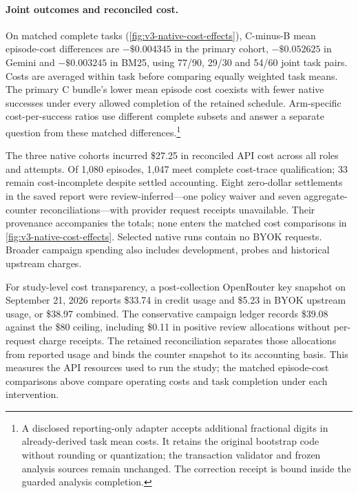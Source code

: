 \paragraph{Joint outcomes and reconciled cost.}
On matched complete tasks (\autoref{fig:v3-native-cost-effects}),
C-minus-B mean episode-cost differences are
$-\$0.004345$ in the primary cohort, $-\$0.052625$ in Gemini and
$-\$0.003245$ in BM25, using 77/90, 29/30 and 54/60 joint task pairs.
Costs are averaged within task before comparing equally weighted task means.
The primary C bundle's lower mean episode cost coexists with fewer native
successes under every allowed completion of the retained schedule. Arm-specific
cost-per-success ratios use different complete subsets and answer a separate
question from these matched differences.\footnote{A disclosed reporting-only
adapter accepts additional fractional digits in already-derived task mean costs.
It retains the original bootstrap code without rounding or quantization;
the transaction validator and frozen analysis sources remain unchanged.
The correction receipt is bound inside the guarded analysis completion.}

The three native cohorts incurred \$27.25 in reconciled API cost across
all roles and attempts. Of 1,080 episodes, 1,047 meet complete cost-trace
qualification; 33 remain cost-incomplete despite settled accounting.
Eight zero-dollar settlements in the saved report were review-inferred---one
policy waiver and seven aggregate-counter reconciliations---with provider
request receipts unavailable. Their provenance accompanies the totals;
none enters the matched cost comparisons in \autoref{fig:v3-native-cost-effects}.
Selected native runs contain no BYOK requests. Broader campaign spending also
includes development, probes and historical upstream charges.

For study-level cost transparency, a post-collection OpenRouter key snapshot
on September 21, 2026 reports \$33.74 in credit usage and \$5.23 in BYOK
upstream usage, or \$38.97 combined. The conservative campaign ledger records
\$39.08 against the \$80 ceiling, including \$0.11 in positive review
allocations without per-request charge receipts. The retained reconciliation
separates those allocations from reported usage and binds the counter snapshot
to its accounting basis. This measures the API resources used to run the study;
the matched episode-cost comparisons above compare operating costs and task
completion under each intervention.

